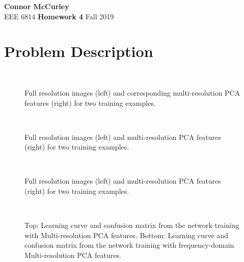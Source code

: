 \documentclass{article}[12 pt]
\begin{document}
	
\begin{center}
	\textbf{\Large Connor McCurley} \\
	EEE 6814 \qquad \textbf{\large Homework 4} \qquad Fall 2019 
\end{center}




\section*{Problem Description}


\begin{figure}[!ht]
	\centering
	\quad
	\\
	\quad
	\caption{Full resolution images (left) and corresponding multi-resolution PCA features (right) for two training examples.}
	\label{fig:sub1}
\end{figure}

\begin{figure}[!ht]
	\centering
	\quad
	\\
	\quad
	\caption{Full resolution images (left) and multi-resolution PCA features (right) for two training examples.}
	\label{fig:sub2}
\end{figure}

\begin{figure}[!ht]
	\centering
	\quad
	\\
	\quad
	\caption{Full resolution images (left) and multi-resolution PCA features (right) for two training examples.}
	\label{fig:sub3}
\end{figure}


\begin{figure}[!ht]
	\centering
	\quad
	\\
	\quad
	\caption{Top: Learning curve and confusion matrix from the network training with Multi-resolution PCA features.  Bottom: Learning curve and confusion matrix from the network training with frequency-domain Multi-resolution PCA features.}
	\label{fig:pcam_confusion_mats}
\end{figure}
\end{document}
